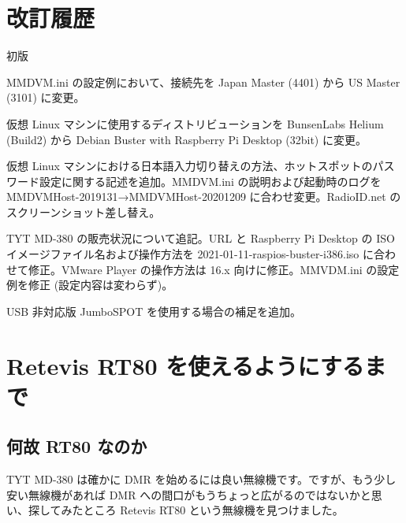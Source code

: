 \documentclass[a4j,oneside]{ujbook}
\begin{document}
\chapter{改訂履歴}
\begin{description}[style=nextline]
 \item[20190822] 初版
 \item[20200222] MMDVM.ini の設定例において、接続先を Japan Master (4401) から US Master (3101) に変更。
 \item[20200223] 仮想 Linux マシンに使用するディストリビューションを BunsenLabs Helium (Build2) から Debian Buster with Raspberry Pi Desktop (32bit) に変更。
 \item[20201213] 仮想 Linux マシンにおける日本語入力切り替えの方法、ホットスポットのパスワード設定に関する記述を追加。MMDVM.ini の説明および起動時のログを MMDVMHost-2019131→MMDVMHost-20201209 に合わせ変更。RadioID.net のスクリーンショット差し替え。
 \item[20210703] TYT MD-380 の販売状況について追記。URL と Raspberry Pi Desktop の ISO イメージファイル名および操作方法を 2021-01-11-raspios-buster-i386.iso に合わせて修正。VMware Player の操作方法は 16.x 向けに修正。MMVDM.ini の設定例を修正 (設定内容は変わらず)。
 \item[20220227] USB 非対応版 JumboSPOT を使用する場合の補足を追加。
\end{description}

\appendix
\chapter{Retevis RT80 を使えるようにするまで}

\section{何故 RT80 なのか}

TYT MD-380 は確かに DMR を始めるには良い無線機です。ですが、もう少し安い無線機があれば DMR への間口がもうちょっと広がるのではないかと思い、探してみたところ Retevis RT80 という無線機を見つけました。
\end{document}
